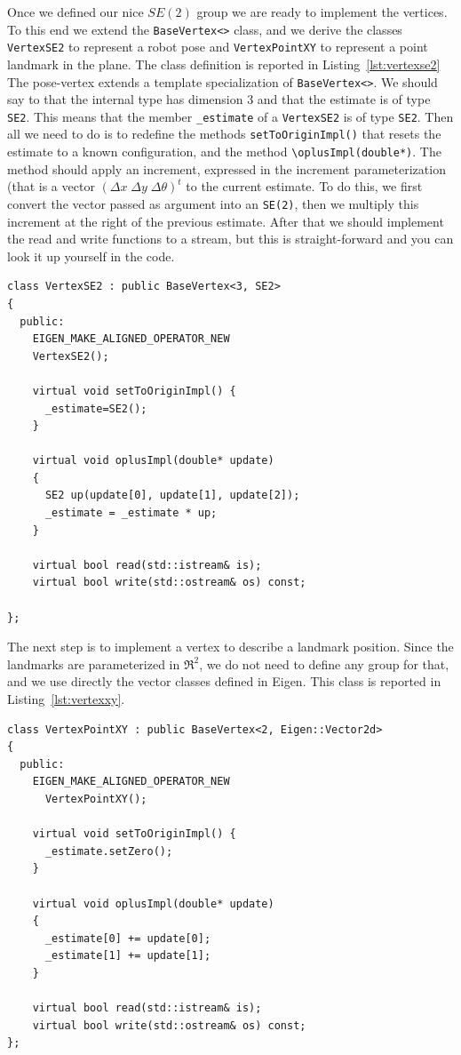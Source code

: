 \documentclass[a4paper]{article}
\begin{document}
Once we defined our nice $SE(2)$ group we are ready to implement the
vertices.  To this end we extend the \verb+BaseVertex<>+ class, and we
derive the classes \verb+VertexSE2+ to represent a robot pose and
\verb+VertexPointXY+ to represent a point landmark in the plane.
The class definition is reported in Listing~\ref{lst:vertexse2}
The pose-vertex extends a template specialization of
\verb+BaseVertex<>+.  We should say to \gopt{} that the internal type
has dimension 3 and that the estimate is of type \verb+SE2+. This
means that the member \verb+_estimate+ of a \verb+VertexSE2+ is of
type \verb+SE2+.  Then all we need to do is to redefine the methods
\verb+setToOriginImpl()+ that resets the estimate to a known
configuration, and the method \verb+\oplusImpl(double*)+.  The method
should apply an increment, expressed in the increment parameterization
(that is a vector $(\Delta x \; \Delta y \; \Delta \theta )^t$ to the
current estimate.  To do this, we first convert the vector passed as
argument into an \verb+SE(2)+, then we multiply this increment at the
right of the previous estimate.  After that we should implement the
read and write functions to a stream, but this is straight-forward and
you can look it up yourself in the code. 

\begin{lstlisting}[float,label=lst:vertexse2,caption=Vertex representing
  a 2D robot pose]
class VertexSE2 : public BaseVertex<3, SE2>
{
  public:
    EIGEN_MAKE_ALIGNED_OPERATOR_NEW
    VertexSE2();

    virtual void setToOriginImpl() {
      _estimate=SE2();
    }

    virtual void oplusImpl(double* update)
    {
      SE2 up(update[0], update[1], update[2]);
      _estimate = _estimate * up;
    }

    virtual bool read(std::istream& is);
    virtual bool write(std::ostream& os) const;

};
\end{lstlisting}
The next step is to implement a vertex to describe a landmark
position.  Since the landmarks are parameterized in $\Re^2$, we do not
need to define any group for that, and we use directly the vector
classes defined in Eigen. This class is reported in Listing~\ref{lst:vertexxy}.

\begin{lstlisting}[float,label=lst:vertexxy,caption=Vertex representing
  a 2D landmark]
class VertexPointXY : public BaseVertex<2, Eigen::Vector2d>
{
  public:
    EIGEN_MAKE_ALIGNED_OPERATOR_NEW
      VertexPointXY();

    virtual void setToOriginImpl() {
      _estimate.setZero();
    }

    virtual void oplusImpl(double* update)
    {
      _estimate[0] += update[0];
      _estimate[1] += update[1];
    }

    virtual bool read(std::istream& is);
    virtual bool write(std::ostream& os) const;
};
\end{lstlisting}
\end{document}
